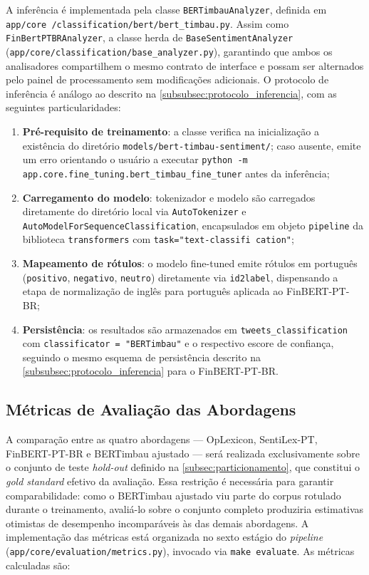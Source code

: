 A inferência é implementada pela classe \texttt{BERTimbauAnalyzer}, definida em \texttt{app/core /classification/bert/bert\_timbau.py}. Assim como \texttt{FinBertPTBRAnalyzer}, a classe herda de \texttt{BaseSentimentAnalyzer} (\texttt{app/core/classification/base\_analyzer.py}), garantindo que ambos os analisadores compartilhem o mesmo contrato de interface e possam ser alternados pelo painel de processamento sem modificações adicionais. O protocolo de inferência é análogo ao descrito na \autoref{subsubsec:protocolo_inferencia}, com as seguintes particularidades:

\begin{enumerate}
	\item \textbf{Pré-requisito de treinamento}: a classe verifica na inicialização a existência do diretório \texttt{models/bert-timbau-sentiment/}; caso ausente, emite um erro orientando o usuário a executar \texttt{python -m app.core.fine\_tuning.bert\_timbau\_fine\_tuner} antes da inferência;
	
	\item \textbf{Carregamento do modelo}: tokenizador e modelo são carregados diretamente do diretório local via \texttt{AutoTokenizer} e \texttt{AutoModelForSequenceClassification}, encapsulados em objeto \texttt{pipeline} da biblioteca \texttt{transformers} com \texttt{task="text-classifi cation"};
	
	\item \textbf{Mapeamento de rótulos}: o modelo fine-tuned emite rótulos em português (\texttt{positivo}, \texttt{negativo}, \texttt{neutro}) diretamente via \texttt{id2label}, dispensando a etapa de normalização de inglês para português aplicada ao FinBERT-PT-BR;
	
	\item \textbf{Persistência}: os resultados são armazenados em \texttt{tweets\_classification} com \texttt{classificator = "BERTimbau"} e o respectivo escore de confiança, seguindo o mesmo esquema de persistência descrito na \autoref{subsubsec:protocolo_inferencia} para o FinBERT-PT-BR.
\end{enumerate}


\subsection{Métricas de Avaliação das Abordagens}
\label{subsec:metricas_avaliacao}

A comparação entre as quatro abordagens --- OpLexicon, SentiLex-PT, FinBERT-PT-BR e BERTimbau ajustado --- será realizada exclusivamente sobre o conjunto de teste \textit{hold-out} definido na \autoref{subsec:particionamento}, que constitui o \textit{gold standard} efetivo da avaliação. Essa restrição é necessária para garantir comparabilidade: como o BERTimbau ajustado viu parte do corpus rotulado durante o treinamento, avaliá-lo sobre o conjunto completo produziria estimativas otimistas de desempenho incomparáveis às das demais abordagens. A implementação das métricas está organizada no sexto estágio do \textit{pipeline} (\texttt{app/core/evaluation/metrics.py}), invocado via \texttt{make evaluate}. As métricas calculadas são:

